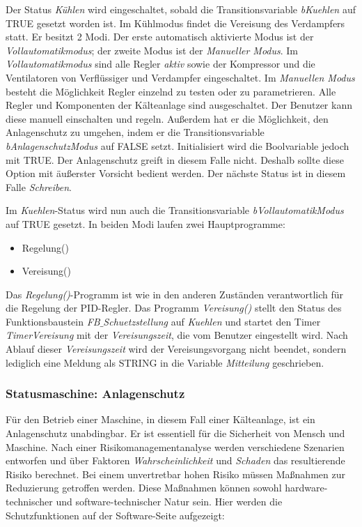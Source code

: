 Der Status \textit{Kühlen} wird eingeschaltet, sobald die Transitionsvariable \textit{bKuehlen} auf TRUE gesetzt worden ist. Im Kühlmodus findet die Vereisung des Verdampfers statt. Er besitzt 2 Modi. Der erste automatisch aktivierte Modus ist der \textit{Vollautomatikmodus}; der zweite Modus ist der \textit{Manueller Modus}. 
Im \textit{Vollautomatikmodus} sind alle Regler \textit{aktiv} sowie der Kompressor und die Ventilatoren von Verflüssiger und Verdampfer eingeschaltet. 
Im \textit{Manuellen Modus} besteht die Möglichkeit Regler einzelnd zu testen oder zu parametrieren. Alle Regler und Komponenten der Kälteanlage sind ausgeschaltet. Der Benutzer kann diese manuell einschalten und regeln. Außerdem hat er die Möglichkeit, den Anlagenschutz zu umgehen, indem er die Transitionsvariable \textit{bAnlagenschutzModus} auf FALSE setzt. Initialisiert wird die Boolvariable jedoch mit TRUE. Der Anlagenschutz greift in diesem Falle nicht. Deshalb sollte diese Option mit äußerster Vorsicht bedient werden. Der nächste Status ist in diesem Falle \textit{Schreiben}. 

Im \textit{Kuehlen}-Status wird nun auch die Transitionsvariable \textit{bVollautomatikModus} auf TRUE gesetzt. In beiden Modi laufen zwei Hauptprogramme:

\begin{itemize}
\item	Regelung()
\item 	Vereisung()
\end{itemize}

Das \textit{Regelung()}-Programm ist wie in den anderen Zuständen verantwortlich für die Regelung der PID-Regler. 
Das Programm \textit{Vereisung()} stellt den Status des Funktionsbaustein \textit{FB$\_$Schuetzstellung} auf \textit{Kuehlen} und startet den Timer  \textit{TimerVereisung} mit der \textit{Vereisungszeit}, die vom Benutzer eingestellt wird. Nach Ablauf dieser \textit{Vereisungszeit} wird der Vereisungsvorgang nicht beendet, sondern lediglich eine Meldung als STRING in die Variable \textit{Mitteilung} geschrieben. 

\subsubsection*{Statusmaschine: Anlagenschutz}
Für den Betrieb einer Maschine, in diesem Fall einer Kälteanlage, ist ein Anlagenschutz unabdingbar. Er ist essentiell für die Sicherheit von Mensch und Maschine. Nach einer Risikomanagementanalyse werden verschiedene Szenarien entworfen und über Faktoren \textit{Wahrscheinlichkeit} und \textit{Schaden} das resultierende Risiko berechnet. 
Bei einem unvertretbar hohen Risiko müssen Maßnahmen zur Reduzierung getroffen werden. Diese Maßnahmen können sowohl hardware-technischer und software-technischer Natur sein. Hier werden die Schutzfunktionen auf der Software-Seite aufgezeigt:

